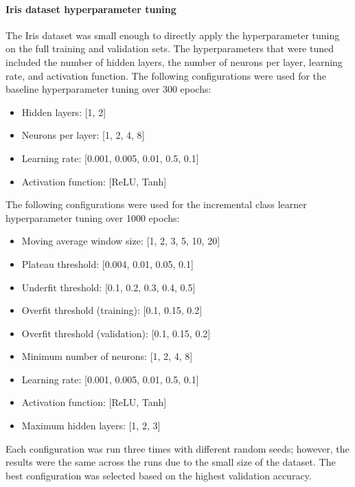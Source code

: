 \documentclass[conference]{IEEEtran}
\begin{document}
\paragraph{Iris dataset hyperparameter tuning}
The Iris dataset was small enough to directly apply the hyperparameter tuning on the full training and validation sets. The hyperparameters that were tuned included the number of hidden layers, the number of 
neurons per layer, learning rate, and activation function. The following configurations were used for the baseline hyperparameter tuning over 300 epochs:
\begin{itemize}
\item Hidden layers: [1, 2]
\item Neurons per layer: [1, 2, 4, 8]
\item Learning rate: [0.001, 0.005, 0.01, 0.5, 0.1]
\item Activation function: [ReLU, Tanh]
\end{itemize}
 The following configurations were used for the incremental class learner hyperparameter tuning over 1000 epochs:
\begin{itemize}
\item Moving average window size: [1, 2, 3, 5, 10, 20]
\item Plateau threshold: [0.004, 0.01, 0.05, 0.1]
\item Underfit threshold: [0.1, 0.2, 0.3, 0.4, 0.5]
\item Overfit threshold (training): [0.1, 0.15, 0.2]
\item Overfit threshold (validation): [0.1, 0.15, 0.2]
\item Minimum number of neurons: [1, 2, 4, 8]
\item Learning rate: [0.001, 0.005, 0.01, 0.5, 0.1]
\item Activation function: [ReLU, Tanh]
\item Maximum hidden layers: [1, 2, 3]
\end{itemize}
Each configuration was run three times with different random seeds; however, the results were the same across the runs due to 
the small size of the dataset. The best configuration was selected based on the highest validation accuracy.
\end{document}
